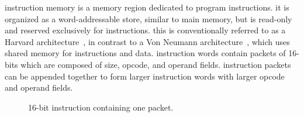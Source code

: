 instruction memory is a memory region dedicated to program instructions.
it is organized as a word-addressable store, similar to main memory,
but is read-only and reserved exclusively for instructions. this is
conventionally referred to as a Harvard architecture~\cite{aiken1946marki},
in contrast to a Von Neumann architecture~\cite{vonneumann1945edvac},
which uses shared memory for instructions and data.
\para
instruction words contain packets of 16-bits which are composed of
size, opcode, and operand fields. instruction packets can be appended
together to form larger instruction words with larger opcode and
operand fields.
\\
\begin{figure}[H]
\centering
{}
\caption{16-bit instruction containing one packet.}
\label{fig:16-bit-instruction-word}
\end{figure}

